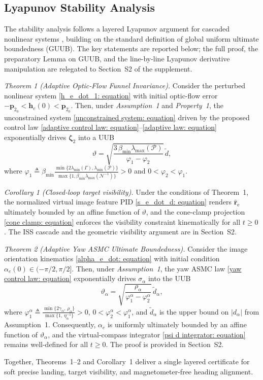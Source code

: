 \subsection{Lyapunov Stability Analysis} \label{stability: section}
The stability analysis follows a layered Lyapunov argument for cascaded nonlinear systems \cite{khalil2002}, building on the standard definition of global uniform ultimate boundedness (GUUB). The key statements are reported below; the full proof, the preparatory Lemma on GUUB, and the line-by-line Lyapunov derivative manipulation are relegated to Section~S2 of the supplement.

\textit{Theorem 1 (Adaptive Optic-Flow Funnel Invariance).}
Consider the perturbed nonlinear system \eqref{h_e_dot_1: equation} with initial optic-flow error $-\boldsymbol{p}_{2_0}<\boldsymbol{h}_e(0)<\boldsymbol{p}_{2_0}$. Then, under \textit{Assumption~1} and \textit{Property~1}, the unconstrained system \eqref{unconstrained system: equation} driven by the proposed control law \eqref{adaptive control law: equation}--\eqref{adaptive law: equation} exponentially drives $\boldsymbol{\zeta}_2$ into a UUB
\begin{equation} \label{UUB bound: equation}
    \vartheta = \sqrt{\frac{3\,\beta_{\min}\lambda_{\max}(\mathcal{P})}{\varphi_1-\varphi_2}}\,\tilde{d},
\end{equation}
where $\varphi_1 \triangleq \beta_{\min}\frac{\min\{2\lambda_{\min}(\Gamma),\lambda_{\min}(\mathcal{P})\}}{\max\{1,\beta_{\min}\lambda_{\max}(\mathcal{N}^{-1})\}}>0$ and $0<\varphi_2<\varphi_1$.

\textit{Corollary 1 (Closed-loop target visibility).} Under the conditions of Theorem~1, the normalized virtual image feature PID \eqref{s_e_dot_d: equation} renders $\hat{\boldsymbol{r}}_\text{e}$ ultimately bounded by an affine function of $\vartheta$, and the cone-clamp projection \eqref{cone clamp: equation} enforces the visibility constraint kinematically for all $t\ge 0$. The ISS cascade and the geometric visibility argument are in Section~S2.

\textit{Theorem 2 (Adaptive Yaw ASMC Ultimate Boundedness).}
Consider the image orientation kinematics \eqref{alpha_e_dot: equation} with initial condition $\alpha_e(0)\in(-\pi/2,\pi/2]$. Then, under \textit{Assumption~1}, the yaw ASMC law \eqref{yaw control law: equation} exponentially drives $\sigma_\alpha$ into the UUB
\begin{equation} \label{yaw UUB bound: equation}
    \vartheta_\alpha = \sqrt{\frac{\rho_\alpha}{\varphi_1^\alpha-\varphi_2^\alpha}}\,\tilde{d}_\alpha,
\end{equation}
where $\varphi_1^\alpha \triangleq \frac{\min\{2\gamma_\alpha,\,\rho_\alpha\}}{\max\{1,\,\eta_\alpha^{-1}\}}>0$, $0<\varphi_2^\alpha<\varphi_1^\alpha$, and $\tilde{d}_\alpha$ is the upper bound on $|d_\alpha|$ from Assumption~1. Consequently, $\alpha_e$ is uniformly ultimately bounded by an affine function of $\vartheta_\alpha$, and the virtual-compass integrator \eqref{psi d integrator: equation} remains well-defined for all $t\ge 0$. The proof is provided in Section~S2.

Together, Theorems~1--2 and Corollary~1 deliver a single layered certificate for soft precise landing, target visibility, and magnetometer-free heading alignment.
